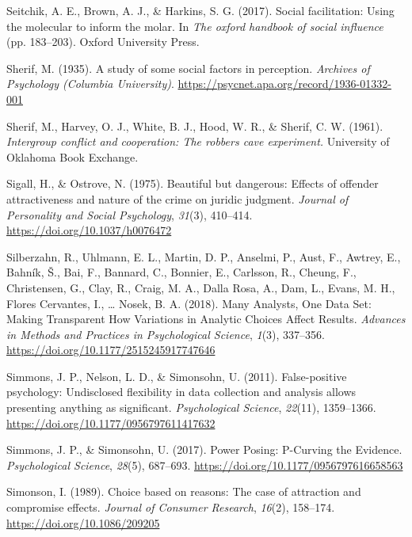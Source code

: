 \documentclass[
  letterpaper,
]{book}
\newlength{\cslhangindent}
\newenvironment{CSLReferences}[2] %
 {\begin{list}{}{%
  \setlength{\itemindent}{0pt}
  \setlength{\leftmargin}{0pt}
  \setlength{\parsep}{0pt}
  \ifodd #1
   \setlength{\leftmargin}{\cslhangindent}
   \setlength{\itemindent}{-1\cslhangindent}
  \fi
  \setlength{\itemsep}{#2\baselineskip}}}
 {\end{list}}
\begin{document}
\begin{CSLReferences}{1}{0}
Seitchik, A. E., Brown, A. J., \& Harkins, S. G. (2017). Social
facilitation: Using the molecular to inform the molar. In \emph{The
oxford handbook of social influence} (pp. 183--203). Oxford University
Press.

Sherif, M. (1935). A study of some social factors in perception.
\emph{Archives of Psychology (Columbia University)}.
\url{https://psycnet.apa.org/record/1936-01332-001}

Sherif, M., Harvey, O. J., White, B. J., Hood, W. R., \& Sherif, C. W.
(1961). \emph{Intergroup conflict and cooperation: {The} robbers cave
experiment.} University of Oklahoma Book Exchange.

Sigall, H., \& Ostrove, N. (1975). Beautiful but dangerous: {Effects} of
offender attractiveness and nature of the crime on juridic judgment.
\emph{Journal of Personality and Social Psychology}, \emph{31}(3),
410--414. \url{https://doi.org/10.1037/h0076472}

Silberzahn, R., Uhlmann, E. L., Martin, D. P., Anselmi, P., Aust, F.,
Awtrey, E., Bahník, Š., Bai, F., Bannard, C., Bonnier, E., Carlsson, R.,
Cheung, F., Christensen, G., Clay, R., Craig, M. A., Dalla Rosa, A.,
Dam, L., Evans, M. H., Flores Cervantes, I., \ldots{} Nosek, B. A.
(2018). Many {Analysts}, {One} {Data} {Set}: {Making} {Transparent}
{How} {Variations} in {Analytic} {Choices} {Affect} {Results}.
\emph{Advances in Methods and Practices in Psychological Science},
\emph{1}(3), 337--356. \url{https://doi.org/10.1177/2515245917747646}

Simmons, J. P., Nelson, L. D., \& Simonsohn, U. (2011). False-positive
psychology: Undisclosed flexibility in data collection and analysis
allows presenting anything as significant. \emph{Psychological Science},
\emph{22}(11), 1359--1366.
\url{https://doi.org/10.1177/0956797611417632}

Simmons, J. P., \& Simonsohn, U. (2017). Power {Posing}: {P}-{Curving}
the {Evidence}. \emph{Psychological Science}, \emph{28}(5), 687--693.
\url{https://doi.org/10.1177/0956797616658563}

Simonson, I. (1989). Choice based on reasons: {The} case of attraction
and compromise effects. \emph{Journal of Consumer Research},
\emph{16}(2), 158--174. \url{https://doi.org/10.1086/209205}


\end{CSLReferences}
\end{document}
